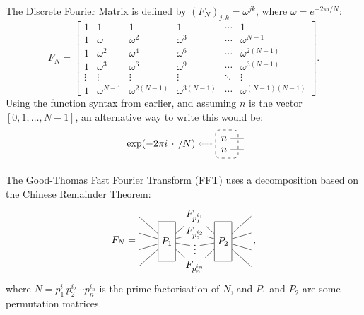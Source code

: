 The Discrete Fourier Matrix is defined by $(F_N)_{j,k}=\omega^{jk}$,
where $\omega = e^{-2\pi i/N}$:
\[
   \renewcommand*{\arraystretch}{1}
F_N =
   \begin{bmatrix}
      1&1&1&1&\cdots &1 \\
      1&\omega&\omega^2&\omega^3&\cdots&\omega^{N-1} \\
      1&\omega^2&\omega^4&\omega^6&\cdots&\omega^{2(N-1)}\\ 1&\omega^3&\omega^6&\omega^9&\cdots&\omega^{3(N-1)}\\
      \vdots&\vdots&\vdots&\vdots&\ddots&\vdots\\
      1&\omega^{N-1}&\omega^{2(N-1)}&\omega^{3(N-1)}&\cdots&\omega^{(N-1)(N-1)}
   \end{bmatrix}
.
\]
Using the function syntax from earlier, and assuming $n$ is the vector $[0, 1, \dots, N-1]$, an alternative way to write this would be:
\[
\begin{tikzpicture}
    \node[anchor=east] (exp) at (.1,0) {$\exp(-2\pi i \,\cdot\, / N)$};
    
    \begin{scope}[xshift=1cm]
        \draw[dashed, rounded corners] (-.3,-0.5) rectangle (.5,0.5);
        \node(n1) at (0,0.2) {$n$};
        \node(n2) at (0,-0.2) {$n$};
        \draw (n1) -- ++(.7,0);
        \draw (n2) -- ++(.7,0);
    \end{scope}
    
    \draw[densely dotted, <-] (exp.east) -- ++(0.5,0);
\end{tikzpicture}
\]

The Good-Thomas Fast Fourier Transform (FFT) uses a decomposition based on the Chinese Remainder Theorem:
\[
F_{N} = 
   \begin{tikzpicture}[baseline=-1em, y=1.7em]
      \node[rectangle, draw, minimum height=4em] (P1) at (0,-.5) {$P_1$};
      \node (A) at (1,1) {$F_{p_1^{i_1}}$};
      \node[rectangle, draw, minimum height=4em] (P2) at (2,-.5) {$P_2$};
      \node (B) at (1,0) {$F_{p_2^{i_2}}$};
      \node (C) at (1,-.8) {$\vdots$};
      \node (D) at (1,-2) {$F_{p_n^{i_n}}$};
      \draw (-1,1) -- (P1) -- (A) -- (P2) -- (3, 1);
      \draw (-1,0) -- (P1) -- (B) -- (P2) -- (3, 0);
      \draw (-1,-1) -- (P1) -- (C) -- (P2) -- (3, -1);
      \draw (-1,-2) -- (P1) -- (D) -- (P2) -- (3, -2);
   \end{tikzpicture}
   \,,
\]
where $N = p_1^{i_1} p_2^{i_2} \cdots p_n^{i_n}$ is the prime factorisation of $N$, and $P_1$ and $P_2$ are some permutation matrices.

